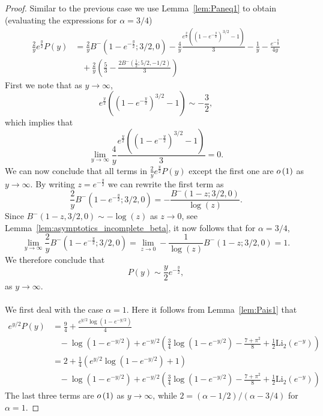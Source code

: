 \begin{proof}
Similar to the previous case we use Lemma~\ref{lem:Paneq1} to obtain (evaluating the expressions for $\alpha = 3/4$)
\begin{align*}
	\frac{2}{y} e^{\frac{y}{2}}P(y) 
	&= \frac{2}{y}B^-(1-e^{-\frac{y}{2}}; 3/2, 0)
		- \frac{4}{y}\frac{e^{\frac{y}{2}}\left((1 - e^{-\frac{y}{2}})^{3/2} - 1\right)}{3}
		- \frac{1}{y} - \frac{ e^{-\frac{y}{2}}}{4 y} \\
	&\hspace{10pt}+ \frac{2}{y} 
		\left(\frac{5}{3} 
		- \frac{2 B^-(\frac{1}{2}; 5/2, -1/2)}{3}\right)
\end{align*}
First we note that as $y \to \infty$,
\begin{equation}\label{eq:asymptotics_Delta_P_auxiliary}
	e^{\frac{y}{2}}\left(\left(1 - e^{-\frac{y}{2}}\right)^{3/2}-1\right) 
	\sim -\frac{3}{2},
\end{equation}
which implies that
\[
	\lim_{y \to \infty} \frac{4}{y}\frac{e^{\frac{y}{2}}\left((1 - e^{-\frac{y}{2}})^{3/2} - 1\right)}{3} = 0.
\]
We can now conclude that all terms in $\frac{2}{y} e^{\frac{y}{2}}P(y)$ except the first one are $o\left(1\right)$ as $y \to \infty$. By writing $z = e^{-\frac{y}{2}}$ we can rewrite the first term as
\[
	\frac{2}{y}B^-(1-e^{-\frac{y}{2}}; 3/2, 0) 
	= -\frac{B^-(1-z; 3/2, 0)}{\log(z)} .
\]
Since $B^-(1-z,3/2,0) \sim - \log(z)$ as $z \to 0$, see Lemma~\ref{lem:asymptotics_incomplete_beta}, it now follows
that for $\alpha = 3/4$,
\[
	\lim_{y \to \infty} \frac{2}{y} B^-(1-e^{-\frac{y}{2}}; 3/2, 0)
	= \lim_{z \to 0} -\frac{1}{\log(z)} B^-(1-z; 3/2, 0) = 1.
\]
We therefore conclude that
\[
	P(y) \sim \frac{y}{2} e^{-\frac{y}{2}},
\]
as $y \to \infty$.

\paragraph{}
We first deal with the case $\alpha = 1$. Here it follows from Lemma~\ref{lem:Pais1} that
\begin{align*}
	e^{y/2}P(y) &= \frac{9}{4} + \frac{e^{y/2}\log(1-e^{-y/2})}{4} \\
	&\hspace{10pt}-\log(1-e^{-y/2}) + e^{-y/2}\left(\frac{3}{4}\log(1-e^{-y/2}) - \frac{7 + \pi^2}{8} + 	
		\frac{1}{2}\mathrm{Li}_2(e^{-y})\right) \\
	&= 2 + \frac{1}{4}\left(e^{y/2}\log(1-e^{-y/2}) + 1\right)\\
	&\hspace{10pt}-\log(1-e^{-y/2}) + e^{-y/2}\left(\frac{3}{4}\log(1-e^{-y/2}) - \frac{7 + \pi^2}{8} + 	
		\frac{1}{2}\mathrm{Li}_2(e^{-y})\right)
\end{align*}
The last three terms are $o\left(1\right)$ as $y \to \infty$, while $2 = (\alpha - 1/2)/(\alpha - 3/4)$ for $\alpha = 1$.


\end{proof}
